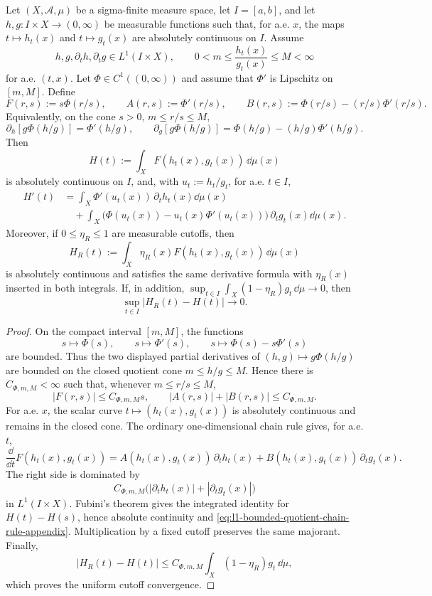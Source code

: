 \begin{lemma}%
\label{lem:l1-bounded-quotient-entropy-chain-rule}
Let \((X,\mathcal A,\mu)\) be a sigma-finite measure space, let
\(I=[a,b]\), and let \(h,g:I\times X\to(0,\infty)\) be measurable
functions such that, for a.e. \(x\), the maps \(t\mapsto h_t(x)\) and
\(t\mapsto g_t(x)\) are absolutely continuous on \(I\).  Assume
\[
h,g,\partial_th,\partial_tg\in L^1(I\times X),
\qquad
0<m\le \frac{h_t(x)}{g_t(x)}\le M<\infty
\]
for a.e. \((t,x)\).  Let \(\Phi\in C^1((0,\infty))\) and assume that
\(\Phi'\) is Lipschitz on \([m,M]\).  Define
\[
F(r,s):=s\Phi(r/s),\qquad
A(r,s):=\Phi'(r/s),\qquad
B(r,s):=\Phi(r/s)-(r/s)\Phi'(r/s).
\]
Equivalently, on the cone \(s>0\), \(m\le r/s\le M\),
\[
\partial_h\!\left[g\Phi(h/g)\right]=\Phi'(h/g),
\qquad
\partial_g\!\left[g\Phi(h/g)\right]
=\Phi(h/g)-(h/g)\Phi'(h/g).
\]
Then
\[
H(t):=\int_X F(h_t(x),g_t(x))\,\dd\mu(x)
\]
is absolutely continuous on \(I\), and, with \(u_t:=h_t/g_t\), for a.e.
\(t\in I\),
\begin{equation}\label{eq:l1-bounded-quotient-chain-rule-appendix}
\begin{split}
H'(t)
&=
\int_X
\Phi'(u_t(x))\,\partial_th_t(x)
\dd\mu(x)\\
&\quad+
\int_X
\bigl(\Phi(u_t(x))-u_t(x)\Phi'(u_t(x))\bigr)\,
\partial_tg_t(x)\dd\mu(x).
\end{split}
\end{equation}
Moreover, if \(0\le\eta_R\le1\) are measurable cutoffs, then
\[
H_R(t):=\int_X \eta_R(x)F(h_t(x),g_t(x))\,\dd\mu(x)
\]
is absolutely continuous and satisfies the same derivative formula with
\(\eta_R(x)\) inserted in both integrals.  If, in addition,
\(\sup_{t\in I}\int_X(1-\eta_R)g_t\,\dd\mu\to0\), then
\[
\sup_{t\in I}|H_R(t)-H(t)|\longrightarrow0 .
\]
\end{lemma}

\begin{proof}
On the compact interval \([m,M]\), the functions
\[
s\mapsto \Phi(s),\qquad s\mapsto \Phi'(s),\qquad
s\mapsto \Phi(s)-s\Phi'(s)
\]
are bounded.  Thus the two displayed partial derivatives of
\((h,g)\mapsto g\Phi(h/g)\) are bounded on the closed quotient cone
\(m\le h/g\le M\).  Hence there is \(C_{\Phi,m,M}<\infty\) such that, whenever
\(m\le r/s\le M\),
\[
|F(r,s)|\le C_{\Phi,m,M}s,\qquad
|A(r,s)|+|B(r,s)|\le C_{\Phi,m,M}.
\]
For a.e. \(x\), the scalar curve \(t\mapsto(h_t(x),g_t(x))\) is absolutely
continuous and remains in the closed cone.  The ordinary one-dimensional chain
rule gives, for a.e. \(t\),
\[
\frac{\dd}{\dd t}F(h_t(x),g_t(x))
=A(h_t(x),g_t(x))\,\partial_th_t(x)
+B(h_t(x),g_t(x))\,\partial_tg_t(x).
\]
The right side is dominated by
\[
C_{\Phi,m,M}\bigl(|\partial_th_t(x)|+|\partial_tg_t(x)|\bigr)
\]
in \(L^1(I\times X)\).  Fubini's theorem gives the integrated identity for
\(H(t)-H(s)\), hence absolute continuity and
\eqref{eq:l1-bounded-quotient-chain-rule-appendix}.  Multiplication by a fixed
cutoff preserves the same majorant.  Finally,
\[
|H_R(t)-H(t)|\le
C_{\Phi,m,M}\int_X(1-\eta_R)g_t\,\dd\mu,
\]
which proves the uniform cutoff convergence.
\end{proof}

